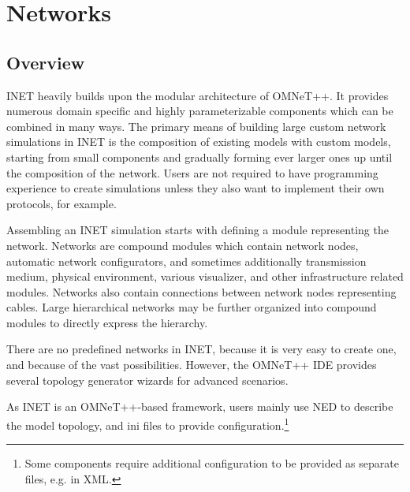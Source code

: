 \chapter{Networks}
\label{cha:networks}

%
%

\section{Overview}


INET heavily builds upon the modular architecture of OMNeT++. It provides 
numerous domain specific and highly parameterizable components which can be
combined in many ways. The primary means of building large custom network 
simulations in INET is the composition of existing models with custom models,
starting from small components and gradually forming ever larger ones up until
the composition of the network. Users are not required to have programming 
experience to create simulations unless they also want to implement 
their own protocols, for example.

Assembling an INET simulation starts with defining a module representing
the network. Networks are compound modules which contain network nodes,
automatic network configurators, and sometimes additionally transmission
medium, physical environment, various visualizer, and other infrastructure
related modules. Networks also contain connections between network nodes
representing cables. Large hierarchical networks may be further organized
into compound modules to directly express the hierarchy.

There are no predefined networks in INET, because it is very easy to create
one, and because of the vast possibilities. However, the OMNeT++ IDE provides
several topology generator wizards for advanced scenarios.

As INET is an OMNeT++-based framework, users mainly use NED to describe the
model topology, and ini files to provide configuration.\footnote{Some 
components require additional configuration to be provided as separate
files, e.g. in XML.} 

